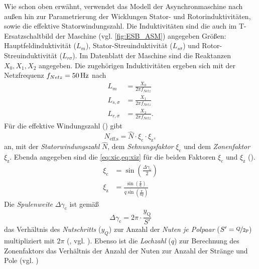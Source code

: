 Wie schon oben erwähnt, verwendet das Modell der Asynchronmaschine nach außen hin zur Parametrierung der Wicklungen Stator- und Rotorinduktivitäten, sowie die effektive Statorwindungszahl. Die Induktivitäten sind die auch im T-Ersatzschaltbild der Maschine (vgl. \cref{fig:ESB_ASM}) angegeben Größen: Hauptfeldinduktivität (\(L_m\)), Stator-Streuinduktivität (\(L_{s\sigma}\)) und Rotor-Streuinduktivität (\(L_{r\sigma}\)). Im Datenblatt der Maschine sind die Reaktanzen \(X_0, X_1, X_2\) angegeben. Die zugehörigen Induktivitäten ergeben sich mit der Netzfrequenz \(f_{Netz}=\unit[50]{\mathrm{Hz}}\) nach
\begin{align}
    L_m &= \frac{X_0}{2\pi f_{Netz}} \\
    L_{s,\sigma} &= \frac{X_1}{2\pi f_{Netz}} \\
    L_{r,\sigma} &= \frac{X_2}{2\pi f_{Netz}}.
\end{align}
Für die effektive Windungszahl () gibt \cite[S. 217]{kralModelicaObjektorientierteModellbildung2019}
\begin{equation}
    N_{\mathrm{eff. s}} = \hat{N}\cdot\xi_{\mathrm{c}}\cdot\xi_{\mathrm{z}}\label{eq:effStatorTurns},
\end{equation}
an, mit der \emph{Statorwindungszahl} \(\hat{N}\), dem \emph{Sehnungsfaktor} \(\xi _{\mathrm{c}}\) und dem \emph{Zonenfaktor} \(\xi _{\mathrm{z}}\). Ebenda angegeben sind die \cref{eq:xic,eq:xiz} für die beiden Faktoren \(\xi _{\mathrm{c}}\) und \(\xi_{\mathrm{z}}\) (\cite[S. 165, S. 217]{kralModelicaObjektorientierteModellbildung2019}).
\begin{align}
    \xi _{\mathrm{c}} &= \sin(\frac{\Delta\gamma _{\mathrm{c}}}{2}) \label{eq:xic}\\
    \xi _{\mathrm{z}} &= \frac{\sin(\frac{\pi}{6})}{q\sin(\frac{\pi}{6q})}\label{eq:xiz}
\end{align}
Die \emph{Spulenweite} \(\Delta\gamma _{\mathrm{c}}\) ist gemäß
\begin{equation}
    \Delta\gamma _{\mathrm{c}} = 2\pi\cdot\frac{y _{\mathrm{Q}}}{S'}
\end{equation}
das Verhältnis des \emph{Nutschritts} (\(y_Q\)) zur Anzahl der \emph{Nuten je Polpaar} (\(S'=\nicefrac{Q}{2p}\)) multipliziert mit \(2\pi\) (\cite[S. 168, S. 161]{kralModelicaObjektorientierteModellbildung2019}, vgl. \cite[S. 76, S. 119]{binderElektrischeMaschinenUnd2012}). Ebenso ist die \emph{Lochzahl} (\(q\)) zur Berechnung des Zonenfaktors das Verhältnis der Anzahl der Nuten zur Anzahl der Stränge und Pole (vgl. \cite[S. 151]{kralModelicaObjektorientierteModellbildung2019})
